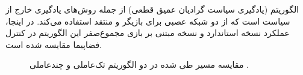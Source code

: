 الگوریتم  (یادگیری سیاست گرادیان عمیق قطعی) از جمله روش‌های یادگیری خارج از سیاست است که از دو شبکه عصبی برای بازیگر و منتقد استفاده می‌کند. در اینجا، عملکرد نسخه استاندارد و نسخه مبتنی بر بازی مجموع‌صفر این الگوریتم در کنترل فضاپیما مقایسه شده است.

\begin{figure}[H]
	\centering
	
	
	\caption{
		مقایسه مسیر طی شده در دو الگوریتم تک‌عاملی و چندعاملی .
	}
\end{figure}


